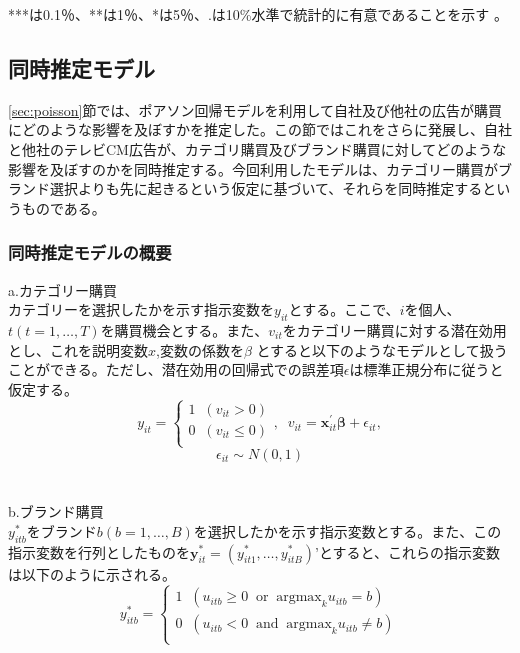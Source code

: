 \documentclass[11pt]{jsarticle}
\begin{document}
***は0.1％、**は1％、*は5％、.は10\%水準で統計的に有意であることを示す 。



\subsection{同時推定モデル}
\label{sec:simultaneous_estimation_model}
\ref{sec:poisson}節では、ポアソン回帰モデルを利用して自社及び他社の広告が購買にどのような影響を及ぼすかを推定した。この節ではこれをさらに発展し、自社と他社のテレビCM広告が、カテゴリ購買及びブランド購買に対してどのような影響を及ぼすのかを同時推定する。今回利用したモデルは、カテゴリー購買がブランド選択よりも先に起きるという仮定に基づいて、それらを同時推定するというものである。

\subsubsection{同時推定モデルの概要}
\label{subsec:simultaneous_summary}
a.カテゴリー購買\\
カテゴリーを選択したかを示す指示変数を$y_{it}$とする。ここで、$i$を個人、$t(t = 1,\ldots,T)$を購買機会とする。また、$v_{it}$をカテゴリー購買に対する潜在効用とし、これを説明変数$x$,変数の係数を$\beta$ とすると以下のようなモデルとして扱うことができる。ただし、潜在効用の回帰式での誤差項$\epsilon$は標準正規分布に従うと仮定する。\\
\begin{equation} \label{formulaa1}
y_{it} = \begin{cases}
             1 \;\; ( v_{it} > 0 )\\
             0 \;\; ( v_{it} \leq 0 )\\
             \end{cases}
             , \;\; v_{it} = \boldsymbol{x}^{\prime}_{it} \boldsymbol{\beta} + \epsilon_{it},
\end{equation}
\begin{equation} \label{formulaa2}
\epsilon_{it} \sim N(0, 1)
\end{equation}\\
\\
b.ブランド購買\\
$y_{itb}^{*}$をブランド$b(b = 1,\ldots,B)$を選択したかを示す指示変数とする。また、この指示変数を行列としたものを$\textbf{y}_{it}^{*} = (y_{it1}^{*},\ldots,y_{itB}^{*})’$とすると、これらの指示変数は以下のように示される。\\
\begin{equation} \label{formulab1}
y^\ast_{itb} = \begin{cases}
             1 \;\; ( u_{itb} \geq 0 \;\; \mbox{or} \;\; \mbox{argmax}_{k}u_{itb} = b)\\
             0 \;\; ( u_{itb} < 0 \;\; \mbox{and} \;\; \mbox{argmax}_{k}u_{itb} \neq b)\\
             \end{cases}
\end{equation}\\
\end{document}
